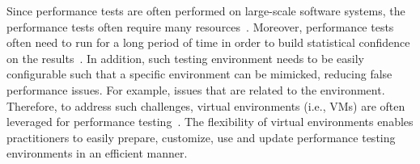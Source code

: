 

Since performance tests are often performed on large-scale software systems, the performance tests often require many resources~\cite{ranjanbook}. Moreover, performance tests often need to run for a long period of time in order to build statistical confidence on the results~\cite{ranjanbook}. In addition, such testing environment needs to be easily configurable such that a specific environment can be mimicked, reducing false performance issues. For example, issues that are related to the environment. Therefore, to address such challenges, virtual environments (i.e., VMs) are often leveraged for performance testing~\cite{whyvirtualisbetter, vmwarehighcost, whyvirtualisbetter}. The flexibility of virtual environments enables practitioners to easily prepare, customize, use and update performance testing environments in an efficient manner.




